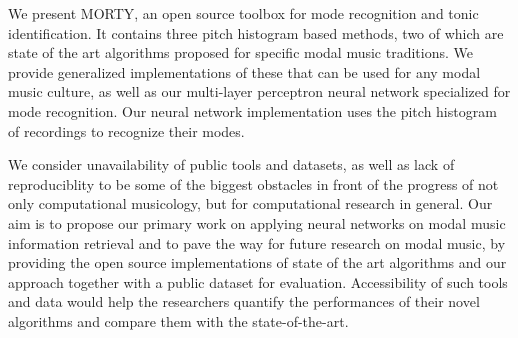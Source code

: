 \documentclass{sig-alternate}
\begin{document}
We present MORTY, an open source toolbox for mode recognition and tonic identification. It contains three pitch histogram based methods, two of which are state of the art algorithms proposed for specific modal music traditions. We provide generalized implementations of these that can be used for any modal music culture, as well as our multi-layer perceptron neural network specialized for mode recognition. Our neural network implementation uses the pitch histogram of recordings to recognize their modes.

We consider unavailability of public tools and datasets, as well as lack of reproduciblity to be some of the biggest obstacles in front of the progress of not only computational musicology, but for computational research in general. Our aim is to propose our primary work on applying neural networks on modal music information retrieval and to pave the way for future research on modal music, by providing the open source implementations of state of the art algorithms and our approach together with a public dataset for evaluation. Accessibility of such tools and data would help the researchers quantify the performances of their novel algorithms and compare them with the state-of-the-art.
\end{document}
